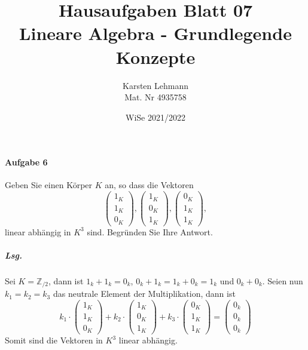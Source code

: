 \documentclass{scrreprt}
\author{Karsten Lehmann\\Mat. Nr 4935758}
\date{WiSe 2021/2022}
\title{Hausaufgaben Blatt 07\\Lineare Algebra - Grundlegende Konzepte}
\begin{document}
\paragraph{Aufgabe 6} Geben Sie einen Körper $K$ an, so dass die Vektoren
\[
  \begin{pmatrix}1_K \\ 1_K \\ 0_K \end{pmatrix},
  \begin{pmatrix}1_K \\ 0_K \\ 1_K \end{pmatrix},
  \begin{pmatrix}0_K \\ 1_K \\ 1_K \end{pmatrix},
\]
linear abhängig in $K^3$ sind.
Begründen Sie Ihre Antwort.

\subparagraph{Lsg.} Sei $K = \mathbb{Z}_{/2}$, dann ist
$1_k + 1_k = 0_k$, $0_k + 1_k = 1_k + 0_k = 1_k$ und $0_k + 0_k$.
Seien nun $k_1 = k_2 = k_3$ das neutrale Element der Multiplikation,
dann ist
\[
  k_1 \cdot \begin{pmatrix}1_K \\ 1_K \\ 0_K \end{pmatrix} +
  k_2 \cdot \begin{pmatrix}1_K \\ 0_K \\ 1_K \end{pmatrix} +
  k_3 \cdot \begin{pmatrix}0_K \\ 1_K \\ 1_K \end{pmatrix} =
  \begin{pmatrix}0_k \\ 0_k \\ 0_k\end{pmatrix}
\]
Somit sind die Vektoren in $K^3$ linear abhängig.
\end{document}
